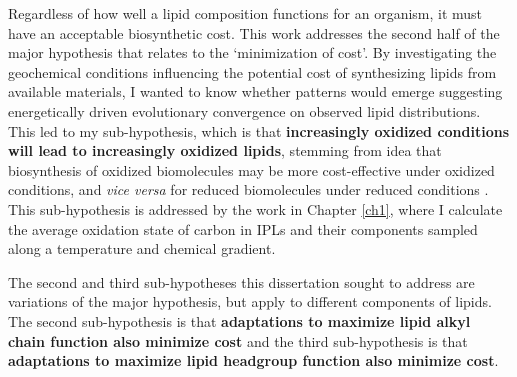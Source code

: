 Regardless of how well a lipid composition functions for an organism, it must have an acceptable biosynthetic cost. This work addresses the second half of the major hypothesis that relates to the `minimization of cost'. By investigating the geochemical conditions influencing the potential cost of synthesizing lipids from available materials, I wanted to know whether patterns would emerge suggesting energetically driven evolutionary convergence on observed lipid distributions. This led to my sub-hypothesis, which is that \textbf{increasingly oxidized conditions will lead to increasingly oxidized lipids}, stemming from idea that biosynthesis of oxidized biomolecules may be more cost-effective under oxidized conditions, and \textit{vice versa} for reduced biomolecules under reduced conditions \citep{amend1998energetics, shock2010potential, dick2011calculation, dick2013metastable}. This sub-hypothesis is addressed by the work in Chapter \ref{ch1}, where I calculate the average oxidation state of carbon in IPLs and their components sampled along a temperature and chemical gradient.

The second and third sub-hypotheses this dissertation sought to address are variations of the major hypothesis, but apply to different components of lipids. The second sub-hypothesis is that \textbf{adaptations to maximize lipid alkyl chain function also minimize cost} and the third sub-hypothesis is that \textbf{adaptations to maximize lipid headgroup function also minimize cost}.




